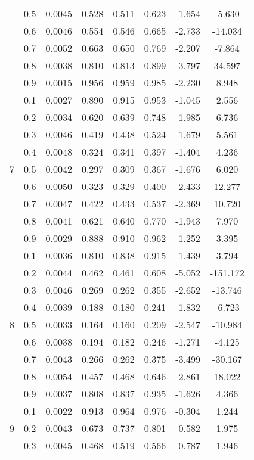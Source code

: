 \documentclass[11pt,a4paper]{report}
\begin{document}
\begin{longtable}{ | c | c || c | c | c | c | c | c | }
 & 0.5 & 0.0045 & 0.528 & 0.511 & 0.623 & -1.654 & -5.630 \\
 & 0.6 & 0.0046 & 0.554 & 0.546 & 0.665 & -2.733 & -14.034 \\
 & 0.7 & 0.0052 & 0.663 & 0.650 & 0.769 & -2.207 & -7.864 \\
 & 0.8 & 0.0038 & 0.810 & 0.813 & 0.899 & -3.797 & 34.597 \\
 & 0.9 & 0.0015 & 0.956 & 0.959 & 0.985 & -2.230 & 8.948 \\
 \hline
\multirow{9}{*}{7} & 0.1 & 0.0027 & 0.890 & 0.915 & 0.953 & -1.045 & 2.556 \\
 & 0.2 & 0.0034 & 0.620 & 0.639 & 0.748 & -1.985 & 6.736 \\
 & 0.3 & 0.0046 & 0.419 & 0.438 & 0.524 & -1.679 & 5.561 \\
 & 0.4 & 0.0048 & 0.324 & 0.341 & 0.397 & -1.404 & 4.236 \\
 & 0.5 & 0.0042 & 0.297 & 0.309 & 0.367 & -1.676 & 6.020 \\
 & 0.6 & 0.0050 & 0.323 & 0.329 & 0.400 & -2.433 & 12.277 \\
 & 0.7 & 0.0047 & 0.422 & 0.433 & 0.537 & -2.369 & 10.720 \\
 & 0.8 & 0.0041 & 0.621 & 0.640 & 0.770 & -1.943 & 7.970 \\
 & 0.9 & 0.0029 & 0.888 & 0.910 & 0.962 & -1.252 & 3.395 \\
 \hline
\multirow{9}{*}{8} & 0.1 & 0.0036 & 0.810 & 0.838 & 0.915 & -1.439 & 3.794 \\
 & 0.2 & 0.0044 & 0.462 & 0.461 & 0.608 & -5.052 & -151.172 \\
 & 0.3 & 0.0046 & 0.269 & 0.262 & 0.355 & -2.652 & -13.746 \\
 & 0.4 & 0.0039 & 0.188 & 0.180 & 0.241 & -1.832 & -6.723 \\
 & 0.5 & 0.0033 & 0.164 & 0.160 & 0.209 & -2.547 & -10.984 \\
 & 0.6 & 0.0038 & 0.194 & 0.182 & 0.246 & -1.271 & -4.125 \\
 & 0.7 & 0.0043 & 0.266 & 0.262 & 0.375 & -3.499 & -30.167 \\
 & 0.8 & 0.0054 & 0.457 & 0.468 & 0.646 & -2.861 & 18.022 \\
 & 0.9 & 0.0037 & 0.808 & 0.837 & 0.935 & -1.626 & 4.366 \\
 \hline
\multirow{9}{*}{9} & 0.1 & 0.0022 & 0.913 & 0.964 & 0.976 & -0.304 & 1.244 \\
 & 0.2 & 0.0043 & 0.673 & 0.737 & 0.801 & -0.582 & 1.975 \\
 & 0.3 & 0.0045 & 0.468 & 0.519 & 0.566 & -0.787 & 1.946 \\

\end{longtable}
\end{document}

